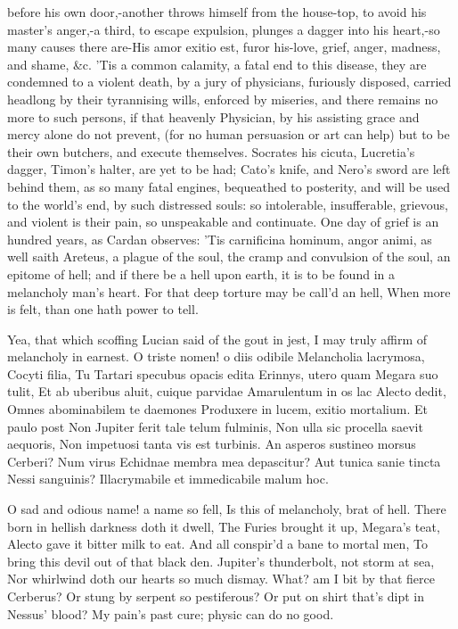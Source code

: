 before his own door,-another throws himself from the house-top, to
avoid his master's anger,-a third, to escape expulsion, plunges a
dagger into his heart,-so many causes there are-His amor exitio est,
furor his-love, grief, anger, madness, and shame, \&c. 'Tis a common
calamity, a fatal end to this disease, they are condemned to a
violent death, by a jury of physicians, furiously disposed, carried
headlong by their tyrannising wills, enforced by miseries, and there
remains no more to such persons, if that heavenly Physician, by his
assisting grace and mercy alone do not prevent, (for no human
persuasion or art can help) but to be their own butchers, and execute
themselves. Socrates his cicuta, Lucretia's dagger, Timon's halter, are
yet to be had; Cato's knife, and Nero's sword are left behind them, as
so many fatal engines, bequeathed to posterity, and will be used to the
world's end, by such distressed souls: so intolerable, insufferable,
grievous, and violent is their pain, so unspeakable and
continuate. One day of grief is an hundred years, as Cardan observes:
'Tis carnificina hominum, angor animi, as well saith Areteus, a plague
of the soul, the cramp and convulsion of the soul, an epitome of hell;
and if there be a hell upon earth, it is to be found in a melancholy
man's heart.
For that deep torture may be call'd an hell,
When more is felt, than one hath power to tell.

Yea, that which scoffing Lucian said of the gout in jest, I may truly
affirm of melancholy in earnest.
O triste nomen! o diis odibile
Melancholia lacrymosa, Cocyti filia,
Tu Tartari specubus opacis edita
Erinnys, utero quam Megara suo tulit,
Et ab uberibus aluit, cuique parvidae
Amarulentum in os lac Alecto dedit,
Omnes abominabilem te daemones
Produxere in lucem, exitio mortalium. Et paulo post
Non Jupiter ferit tale telum fulminis,
Non ulla sic procella saevit aequoris,
Non impetuosi tanta vis est turbinis.
An asperos sustineo morsus Cerberi?
Num virus Echidnae membra mea depascitur?
Aut tunica sanie tincta Nessi sanguinis?
Illacrymabile et immedicabile malum hoc.

O sad and odious name! a name so fell,
Is this of melancholy, brat of hell.
There born in hellish darkness doth it dwell,
The Furies brought it up, Megara's teat,
Alecto gave it bitter milk to eat.
And all conspir'd a bane to mortal men,
To bring this devil out of that black den.
Jupiter's thunderbolt, not storm at sea,
Nor whirlwind doth our hearts so much dismay.
What? am I bit by that fierce Cerberus?
Or stung by serpent so pestiferous?
Or put on shirt that's dipt in Nessus' blood?
My pain's past cure; physic can do no good.

